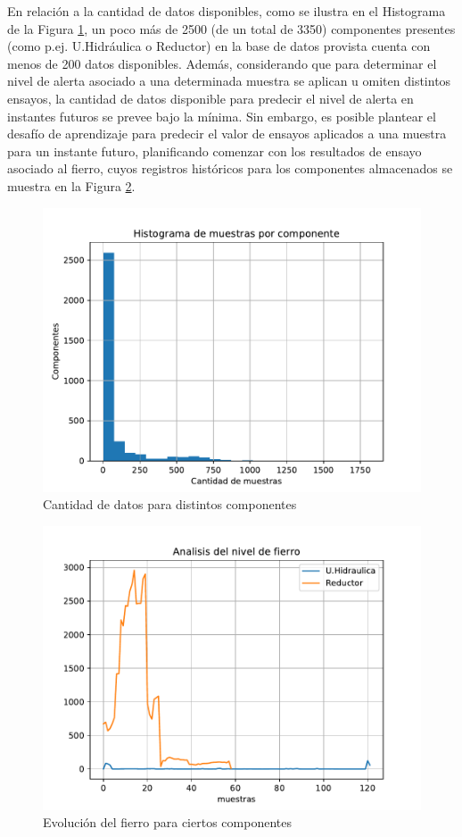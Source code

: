 \documentclass{article}
\begin{document}
En relaci\'on a la cantidad de datos disponibles, como se ilustra en el Histograma de la Figura \ref{fig:histogram}, un poco m\'as de 2500 (de un total de 3350) componentes presentes (como p.ej. U.Hidr\'aulica o Reductor) en la base de datos provista cuenta con menos de 200 datos disponibles. Adem\'as, considerando que para determinar el nivel de alerta asociado a una determinada muestra se aplican u omiten distintos ensayos, la cantidad de datos disponible para predecir el nivel de alerta en instantes futuros se prevee bajo la m\'inima. Sin embargo, es posible plantear el desaf\'io de aprendizaje para predecir el valor de ensayos aplicados a una muestra para un instante futuro, planificando comenzar con los resultados de ensayo asociado al fierro, cuyos registros hist\'oricos para los componentes almacenados se muestra en la Figura \ref{fig:fierro}.

\begin{figure}[!htbp]
\centering
\includegraphics[width=.75\textwidth]{figs/data_per_component_hist.pdf}
\caption{Cantidad de datos para distintos componentes}
\label{fig:histogram}
\end{figure}

\begin{figure}[!htbp]
\centering
\includegraphics[width=.75\textwidth]{figs/iron.pdf}
\caption{Evoluci\'on del fierro para ciertos componentes}
\label{fig:fierro}
\end{figure}
\end{document}

